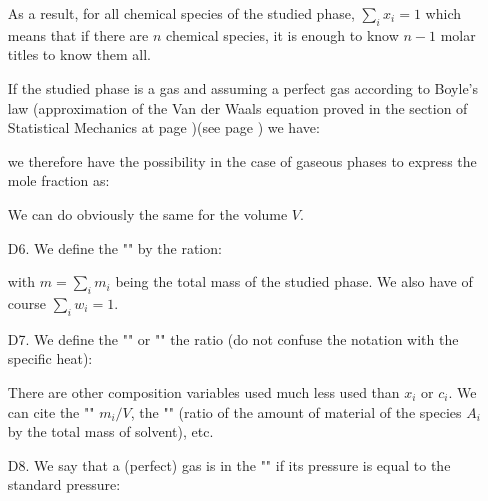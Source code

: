 \begin{enumerate}
		As a result, for all chemical species of the studied phase, $\sum_i x_i=1$ which means that if there are $n$ chemical species, it is enough to  know $n-1$ molar titles to know them all.
	
		If the studied phase is a gas and assuming a perfect gas according to Boyle's law (approximation of the Van der Waals equation proved in the section of Statistical Mechanics at page \pageref{Van der Waals state equation})(see page \pageref{Van der Waals state equation}) we have:
		
		we therefore have the possibility in the case of gaseous phases to express the mole fraction as:
		
		\begin{tcolorbox}[title=Remark,arc=10pt,breakable,drop lifted shadow,
  skin=enhanced,
  skin first is subskin of={enhancedfirst}{arc=10pt,no shadow},
  skin middle is subskin of={enhancedmiddle}{arc=10pt,no shadow},
  skin last is subskin of={enhancedlast}{drop lifted shadow}]
		We can do obviously the same for the volume $V$.
		\end{tcolorbox}	
		
		\item[D6.] We define the "" by the ration:
		
		with $m=\sum_i m_i$ being the total mass of the studied phase. We also have of course $\sum_i w_i=1$.
		
		\item[D7.] We define the "" or "" the ratio (do not confuse the notation with the specific heat):
		
		\begin{tcolorbox}[title=Remark,arc=10pt,breakable,drop lifted shadow,
  skin=enhanced,
  skin first is subskin of={enhancedfirst}{arc=10pt,no shadow},
  skin middle is subskin of={enhancedmiddle}{arc=10pt,no shadow},
  skin last is subskin of={enhancedlast}{drop lifted shadow}]
		There are other composition variables used much less used than $x_i$ or $c_i$. We can cite the "" $m_i/V$, the "" (ratio of the amount of material of the species $A_i$ by the total mass of solvent), etc.
		\end{tcolorbox}
		
		\item[D8.] We say that a (perfect) gas is in the "" if its pressure is equal to the standard pressure:
		

\end{enumerate}
